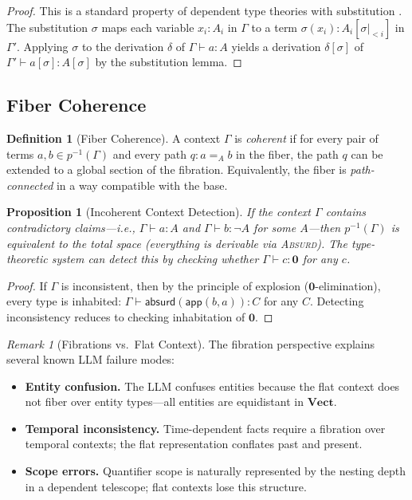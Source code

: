 \documentclass[11pt,a4paper]{article}
\theoremstyle{plain}
\newtheorem{proposition}[theorem]{Proposition}
\theoremstyle{definition}
\newtheorem{definition}[theorem]{Definition}
\theoremstyle{remark}
\newtheorem{remark}[theorem]{Remark}
\newcommand{\Vect}{\mathbf{Vect}}
\begin{document}
\begin{proof}
This is a standard property of dependent type theories with substitution \cite{martinlof1984}.
The substitution $\sigma$ maps each variable $x_i : A_i$ in $\Gamma$ to a term $\sigma(x_i) : A_i[\sigma|_{<i}]$ in $\Gamma'$.
Applying $\sigma$ to the derivation $\delta$ of $\Gamma \vdash a : A$ yields a derivation $\delta[\sigma]$ of $\Gamma' \vdash a[\sigma] : A[\sigma]$ by the substitution lemma.
\end{proof}

\subsection{Fiber Coherence}

\begin{definition}[Fiber Coherence]\label{def:fiber-coherence}
A context $\Gamma$ is \emph{coherent} if for every pair of terms $a, b \in p^{-1}(\Gamma)$ and every path $q : a =_A b$ in the fiber, the path $q$ can be extended to a global section of the fibration.
Equivalently, the fiber is \emph{path-connected} in a way compatible with the base.
\end{definition}

\begin{proposition}[Incoherent Context Detection]\label{prop:incoherent}
If the context $\Gamma$ contains contradictory claims---i.e., $\Gamma \vdash a : A$ and $\Gamma \vdash b : \neg A$ for some $A$---then $p^{-1}(\Gamma)$ is equivalent to the total space (everything is derivable via \textsc{Absurd}).
The type-theoretic system can detect this by checking whether $\Gamma \vdash c : \mathbf{0}$ for any $c$.
\end{proposition}

\begin{proof}
If $\Gamma$ is inconsistent, then by the principle of explosion ($\mathbf{0}$-elimination), every type is inhabited: $\Gamma \vdash \mathsf{absurd}(\mathsf{app}(b, a)) : C$ for any $C$.
Detecting inconsistency reduces to checking inhabitation of $\mathbf{0}$.
\end{proof}

\begin{remark}[Fibrations vs.\ Flat Context]
The fibration perspective explains several known LLM failure modes:
\begin{itemize}[nosep]
  \item \textbf{Entity confusion.} The LLM confuses entities because the flat context does not fiber over entity types---all entities are equidistant in $\Vect$.
  \item \textbf{Temporal inconsistency.} Time-dependent facts require a fibration over temporal contexts; the flat representation conflates past and present.
  \item \textbf{Scope errors.} Quantifier scope is naturally represented by the nesting depth in a dependent telescope; flat contexts lose this structure.
\end{itemize}
\end{remark}
\end{document}
